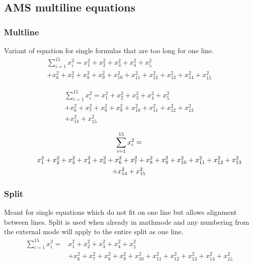 \documentclass[12pt,a4paper]{article}
\theoremstyle{clearprint}
\begin{document}
\subsection[AMS multiline]{AMS multiline equations}

\subsubsection[Multline]{Multline}

Variant of equation for single formulas that are too long for one line. 
\begin{multline}
\sum_{i=1}^{15} x_i^2 = x_1^2 + x_2^2 + x_3^2 + x_4^2 + x_5^2\\
 + x_6^2 + x_7^2 + x_8^2 + x_9^2 + x_{10}^2+ x_{11}^2 + x_{12}^2 + x_{13}^2 + x_{14}^2 + x_{15}^2
\end{multline}

\begin{multline}
\sum_{i=1}^{15} x_i^2 = x_1^2 + x_2^2 + x_3^2 + x_4^2 + x_5^2\\
+ x_6^2 + x_7^2 + x_8^2 + x_9^2 + x_{10}^2+ x_{11}^2 + x_{12}^2 + x_{13}^2\\ 
+ x_{14}^2 + x_{15}^2
\end{multline}

\begin{multline}
\sum_{i=1}^{15} x_i^2 = \\
\shoveleft{\qquad x_1^2 + x_2^2 + x_3^2 + x_4^2 + x_5^2+ x_6^2 + x_7^2 + x_8^2 + x_9^2 + x_{10}^2+ x_{11}^2 + x_{12}^2 + x_{13}^2}\\ 
+ x_{14}^2 + x_{15}^2
\end{multline}


\subsubsection[Split]{Split}

Meant for single equations which do not fit on one line but allows alignment between lines. Split is used when already in mathmode and any numbering from the external mode will apply to the entire split as one line.
\begin{equation}\begin{split}
\sum_{i=1}^{15} x_i^2 =& x_1^2 + x_2^2 + x_3^2 + x_4^2 + x_5^2 \\
&+ x_6^2 + x_7^2 + x_8^2 + x_9^2 + x_{10}^2+ x_{11}^2 + x_{12}^2 + x_{13}^2 + x_{14}^2 + x_{15}^2
\end{split}\end{equation}
\end{document}
